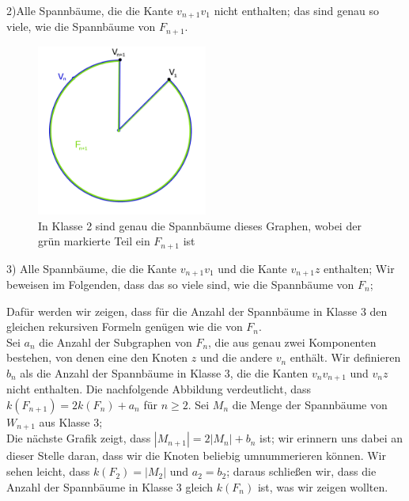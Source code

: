2)Alle Spannbäume, die die Kante $v_{n+1}v_1$ nicht enthalten; das sind genau so viele, wie die Spannbäume von $F_{n+1}$.\\
\begin{figure}[H]
  \centering
 \includegraphics[width=0.5\textwidth]{klasse2.png}
 \caption{In Klasse 2 sind genau die Spannbäume dieses Graphen, wobei der grün markierte Teil ein $F_{n+1}$ ist}
 \label{klasse2} %
\end{figure}
3) Alle Spannbäume, die die Kante $v_{n+1}v_1$ und die Kante $v_{n+1}z$ enthalten; Wir beweisen im Folgenden, dass das so viele sind, wie die Spannbäume von $F_n$;
\par
\endgroup
Dafür werden wir zeigen, dass für die Anzahl der Spannbäume in Klasse 3 den gleichen rekursiven Formeln genügen wie die von $F_n$.\\
Sei $a_n$ die Anzahl der Subgraphen von $F_n$, die aus genau zwei Komponenten bestehen, von denen eine den Knoten $z$ und die andere $v_n$ enthält.
Wir definieren $b_n$ als die Anzahl der Spannbäume in Klasse 3, die die Kanten $v_nv_{n+1}$ und $v_nz$ nicht enthalten. 
Die nachfolgende Abbildung verdeutlicht, dass $\mathit{k}(F_{n+1})=2\mathit{k}(F_{n})+a_n$ für $n\geq 2$.
Sei $M_n$ die Menge der Spannbäume von $W_{n+1}$ aus Klasse 3;\\
Die nächste Grafik zeigt, dass $|M_{n+1}|=2|M_n|+b_n$ ist; wir erinnern uns dabei an dieser Stelle daran, dass wir die Knoten beliebig umnummerieren können.
Wir sehen leicht, dass $\mathit{k}(F_2) = |M_2|$ und $a_2=b_2$; daraus schließen wir, dass die Anzahl der Spannbäume in Klasse 3 gleich $\mathit{k}(F_{n})$ ist, was wir zeigen wollten.
